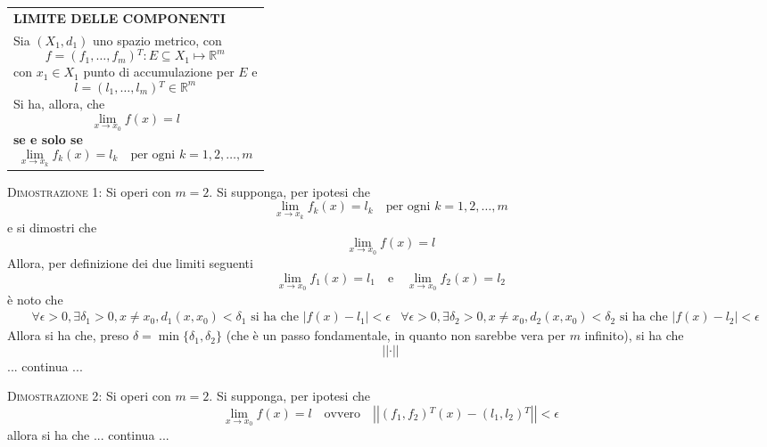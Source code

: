 \documentclass[a4paper]{extarticle}
\renewcommand\arraystretch{}
\begin{document}
\vspace{1em}
\setlength{\tabcolsep}{14pt}
\renewcommand{\arraystretch}{2}
\noindent
\begin{tabularx}{\textwidth}{@{}|P|@{}}
    \hline
    {\textbf{LIMITE DELLE COMPONENTI}}\\
    \parbox{\linewidth}{Sia $(X_1,d_1)$ uno spazio metrico, con
    \[f=(f_1,\dots,f_m){^T} : E \subseteq X_1 \longmapsto \mathbb{R}^m\]
    con $x_1 \in X_1$ punto di accumulazione per $E$ e
    \[l = (l_1,\dots,l_m){^T} \in \mathbb{R}^m\]
    Si ha, allora, che
    \[\lim_{x \to x_0} f(x) = l\]
    \textbf{se e solo se}
    \[\lim_{x \to x_k} f_k(x) = l_k \hspace{1em} \text{per ogni } k =1,2,\dots,m\]
     \vspace{-1mm}}\\
    \hline
\end{tabularx}

\vspace{2em}
\noindent
\normalfont \normalsize
\textsc{Dimostrazione 1}: Si operi con $m=2$. Si supponga, per ipotesi che
\[\lim_{x \to x_k} f_k(x) = l_k \hspace{1em} \text{per ogni } k =1,2,\dots,m\]
e si dimostri che
\[\lim_{x \to x_0} f(x) = l\]
Allora, per definizione dei due limiti seguenti
\[\lim_{x \to x_0} f_1(x) = l_1 \hspace{1em} \text{e} \hspace{1em} \lim_{x \to x_0} f_2(x) = l_2\]
è noto che
\begin{align*}
    &\forall \epsilon>0, \exists \delta_1 > 0, x \neq x_0, d_1(x,x_0) < \delta_1 \text{ si ha che } \left \vert f(x) - l_1 \right \vert < \epsilon
    &\forall \epsilon>0, \exists \delta_2 > 0, x \neq x_0, d_2(x,x_0) < \delta_2 \text{ si ha che } \left \vert f(x) - l_2 \right \vert < \epsilon
\end{align*}
Allora si ha che, preso $\delta = \min\{\delta_1,\delta_2\}$ (che è un passo fondamentale, in quanto non sarebbe vera per $m$ infinito), si ha che
\[\left \vert \left \vert \cdot \right \vert \right \vert\]
... continua ...

\vspace{2em}
\noindent
\normalfont \normalsize
\textsc{Dimostrazione 2}: Si operi con $m=2$. Si supponga, per ipotesi che
\[\lim_{x \to x_0} f(x) = l \hspace{1em} \text{ovvero} \hspace{1em} \left \vert \left \vert (f_1,f_2){^T}(x) - (l_1,l_2){^T} \right \vert \right \vert < \epsilon\]
allora si ha che
... continua ...
\end{document}
